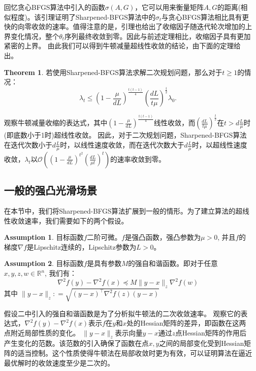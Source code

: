 \documentclass[a4paper,twoside,AutoFakeBold]{article}
\theoremstyle{definition}
\newtheorem{thrm2}{{Theorem}}
\newtheorem{assumption}{Assumption}[section]
\begin{document}
回忆贪心BFGS算法中引入的函数$\sigma (A,G)$，它可以用来衡量矩阵$A,G$的距离(相似程度)。该引理证明了Sharpened-BFGS算法中的$\sigma_t$与贪心BFGS算法相比具有更快的向零收敛的速率。值得注意的是，引理也给出了收缩因子随迭代轮次增加的上界变化情况，整个$\theta_t$序列最终收敛到零。因此与前述定理相比，收缩因子具有更加紧密的上界。
由此我们可以得到牛顿减量超线性收敛的结论，由下面的定理给出。

\begin{thrm2}
    若使用Sharpened-BFGS算法求解二次规划问题，那么对于$t\ge 1$的情况：
    \begin{equation}
        \lambda_t \leq \left(1 - \frac{\mu}{dL}\right)^{\frac{t(t - 1)}{4}} \left(\frac{dL}{t\mu}\right)^{\frac{t}{2}}\lambda_0.
    \end{equation}
\end{thrm2}

观察牛顿减量收缩的表达式，其中$\left(1 - \frac{\mu}{dL}\right)^{\frac{t(t - 1)}{4}}$线性收敛，而$\left(\frac{dL}{t\mu}\right)^{\frac{t}{2}}$在$t>d\frac{L}{\mu}$时(即底数小于1时)超线性收敛。
因此，对于二次规划问题，Sharpened-BFGS算法在迭代次数小于$d\frac{L}{\mu}$时，以线性速度收敛，而在迭代次数大于$d\frac{L}{\mu}$时，以超线性速度收敛，$\lambda_t$以$\mathcal{O}((1-\frac{\mu}{dL})^{t^2} (\frac{dL}{\mu t})^t)$的速率收敛到零。


\subsection{一般的强凸光滑场景}

在本节中，我们将Sharpened-BFGS算法扩展到一般的情形。为了建立算法的超线性收敛速率，我们需要如下的两个假设。
\begin{assumption}
    目标函数$f$二阶可微。$f$是强凸函数，强凸参数为$\mu>0$, 并且$f$的梯度$\nabla f$是Lipschitz连续的，Lipschitz参数为$L>0$。
\end{assumption}
\begin{assumption}
    目标函数$f$是具有参数$M$的强自和谐函数。即对于任意$x,y,z,w\in \mathbb{R}^n$, 我们有：
    \begin{equation}
        \nabla^{2}{f(y)} - \nabla^{2}{f(x)} \preceq M\|y - x\|_{z}\nabla^{2}{f(w)}
    \end{equation}
    其中 $\|y - x\|_{z} : = \sqrt{(y - x)^\top \nabla^2{f(z)} (y - x)}$
\end{assumption}

假设二中引入的强自和谐函数是为了分析拟牛顿法的二次收敛速率。
观察它的表达式，$\nabla^{2}{f(y)} - \nabla^{2}{f(x)}$表示$f$在$y$和$x$处的Hessian矩阵的差异，即函数在这两点附近局部性质的变化。
$\|y - x\|_{z}$表示向量$y-x$通过$z$点Hessian矩阵的作用后产生变化的范数。该范数的引入确保了函数在点$x,y$之间的局部变化受到Hessian矩阵的适当控制。这个性质使得牛顿法在局部收敛时更为有效，可以证明算法在逼近最优解时的收敛速度至少是二次的。
\end{document}
